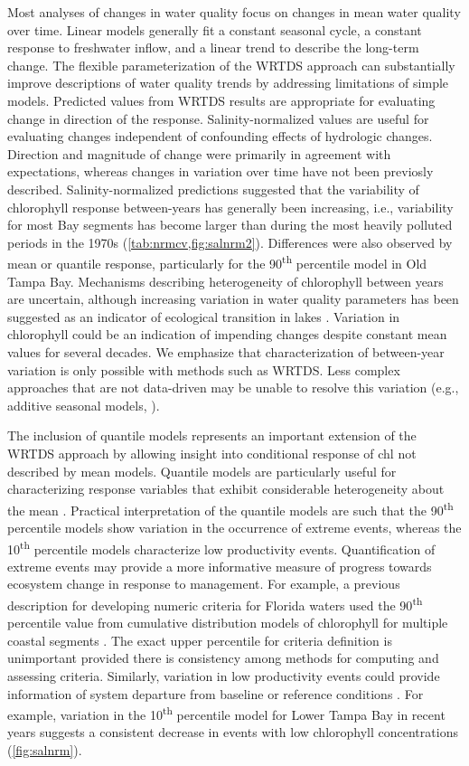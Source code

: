 \documentclass{svjour3}\usepackage[]{graphicx}\usepackage[]{color}
\newcommand{\nine}{90\textsuperscript{th} percentile }
\newcommand{\ten}{10\textsuperscript{th} percentile }
\begin{document}
Most analyses of changes in water quality focus on changes in mean water quality over time.  Linear models generally fit a constant seasonal cycle, a constant response to freshwater inflow, and a linear trend to describe the long-term change.  The flexible parameterization of the \ac{WRTDS} approach can substantially improve descriptions of water quality trends by addressing limitations of simple models.  Predicted values from \ac{WRTDS} results are appropriate for evaluating change in direction of the response. Salinity-normalized values are useful for evaluating changes independent of confounding effects of hydrologic changes.  Direction and magnitude of change were primarily in agreement with expectations, whereas changes in variation over time have not been previosly described.  Salinity-normalized predictions suggested that the variability of chlorophyll response between-years has generally been increasing, i.e., variability for most Bay segments has become larger than during the most heavily polluted periods in the 1970s (\cref{tab:nrmcv,fig:salnrm2}).  Differences were also observed by mean or quantile response, particularly for the \nine model in Old Tampa Bay.  Mechanisms describing heterogeneity of chlorophyll between years are uncertain, although increasing variation in water quality parameters has been suggested as an indicator of ecological transition in lakes \cite{Carpenter06}.   Variation in chlorophyll could be an indication of impending changes despite constant mean values for several decades.  We emphasize that characterization of between-year variation is only possible with methods such as \ac{WRTDS}.  Less complex approaches that are not data-driven may be unable to resolve this variation (e.g., additive seasonal models, \cite{Cloern10}).     

The inclusion of quantile models represents an important extension of the \ac{WRTDS} approach by allowing insight into conditional response of \ac{chl} not described by mean models.  Quantile models are particularly useful for characterizing response variables that exhibit considerable heterogeneity about the mean \cite{Terrell96,Cade03}.  Practical interpretation of the quantile models are such that the \nine models show variation in the occurrence of extreme events, whereas the \ten models characterize low productivity events.  Quantification of extreme events may provide a more informative measure of progress towards ecosystem change in response to management.  For example, a previous description for developing numeric criteria for Florida waters used the \nine value from cumulative distribution models of chlorophyll for multiple coastal segments \cite{Schaeffer12}.  The exact upper percentile for criteria definition is unimportant provided there is consistency among methods for computing and assessing criteria.  Similarly, variation in low productivity events could provide information of system departure from baseline or reference conditions \cite{Stoddard06}. For example, variation in the \ten model for Lower Tampa Bay in recent years suggests a consistent decrease in events with low chlorophyll concentrations (\cref{fig:salnrm}).
\end{document}
